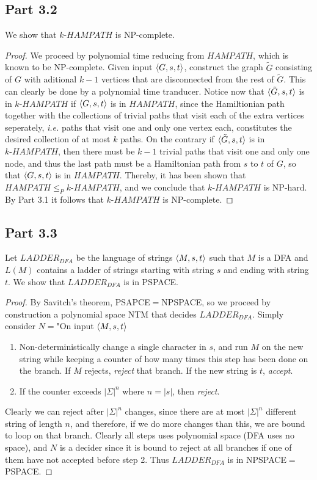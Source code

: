 \documentclass[a4paper,11pt]{article}
\newcommand{\abs}[1]{\left\lvert #1 \right\rvert}
\newcommand{\ie}{\emph{i.e.} }
\numberwithin{equation}{section}
\begin{document}
\subsection*{Part 3.2}
We show that $ k\text{-}HAMPATH $ is NP-complete. \begin{proof}
	We proceed by polynomial time reducing from $ HAMPATH $, which is known to be NP-complete. Given input $ \braket{G,s,t} $, construct the graph $ \tilde{G} $ consisting of $ G $ with aditional $ k-1 $ vertices that are disconnected from the rest of $ \tilde{G} $. This can clearly be done by a polynomial time tranducer. Notice now that $ \braket{\tilde{G},s,t} $ is in $ k\text{-}HAMPATH $ if $ \braket{G,s,t} $ is in $ HAMPATH $, since the Hamiltionian path together with the collections of trivial paths that visit each of the extra vertices seperately, \ie paths that visit one and only one vertex each, constitutes the desired collection of at most $ k $ paths. On the contrary if $ \braket{\tilde{G},s,t} $ is in $ k\text{-}HAMPATH $, then there must be $k-1 $ trivial paths that visit one and only one node, and thus the last path must be a Hamiltonian path from $ s $ to $ t $ of $ G $, so that $ \braket{G,s,t} $ is in $ HAMPATH $. Thereby, it has been shown that $ HAMPATH\leq_Pk\text{-}HAMPATH $, and we conclude that $k\text{-}HAMPATH  $ is NP-hard. By Part 3.1 it follows that $ k\text{-}HAMPATH $ is NP-complete.  
\end{proof}
\subsection*{Part 3.3}
Let $ LADDER_{DFA} $ be the language of strings $ \braket{M,s,t} $ such that $ M $ is a DFA and $ L(M) $ contains a ladder of strings starting with string $ s $ and ending with string $ t $. We show that $ LADDER_{DFA} $ is in PSPACE.\begin{proof}
	By Savitch's theorem, PSAPCE$ = $NPSPACE, so we proceed by construction a polynomial space NTM that decides $ LADDER_{DFA} $. Simply consider $ N= $"On input $ \braket{M,s,t} $\begin{enumerate}
		\item Non-deterministically change a single character in $ s $, and run $ M $ on the new string while keeping a counter of how many times this step has been done on the branch. If $ M $ rejects, \emph{reject} that branch. If the new string is $ t $, \emph{accept}.
		\item  If the counter exceeds $ \abs{\Sigma}^n $ where $ n=\abs{s} $, then \emph{reject}.
	\end{enumerate}
	Clearly we can reject after $ \abs{\Sigma}^n $ changes, since there are at most $ \abs{\Sigma}^n $ different string of length $ n $, and therefore, if we do more changes than this, we are bound to loop on that branch.
	Clearly all steps uses polynomial space (DFA uses no space), and $ N $ is a decider since it is bound to reject at all branches if one of them have not accepted before step 2. Thus $ LADDER_{DFA} $ is in NPSPACE$ = $PSPACE.
\end{proof} 
\end{document}

